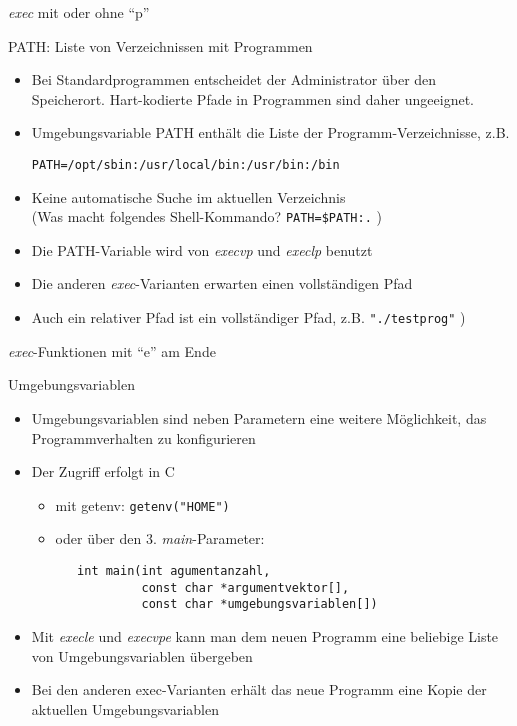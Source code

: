 \documentclass[utf8,9pt]{beamer}
\begin{document}
\begin{frame}[fragile]{{\em exec\/} mit oder ohne "`p"'}{}

\begin{block}{PATH: Liste von Verzeichnissen mit Programmen}
\begin{itemize}
\item Bei Standardprogrammen entscheidet der Administrator über den Speicherort.
   Hart-kodierte Pfade in Programmen sind daher ungeeignet.
\item Umgebungsvariable PATH enthält die Liste der Programm-Verzeichnisse, z.B.
\begin{verbatim}
PATH=/opt/sbin:/usr/local/bin:/usr/bin:/bin
\end{verbatim} 
\item Keine automatische Suche im aktuellen Verzeichnis\\
   (Was macht folgendes Shell-Kommando? {\tt PATH=\$PATH:.} )
\item Die PATH-Variable wird von {\em execvp\/} und {\em execlp\/} benutzt
\item Die anderen {\em exec\/}-Varianten erwarten einen vollständigen Pfad
\item Auch ein relativer Pfad ist ein vollständiger Pfad, z.B. \verb#"./testprog"# ) 
\end{itemize}
\end{block}
\end{frame}







\begin{frame}[fragile]{{\em exec\/}-Funktionen mit "`e"' am Ende}{}
\begin{block}{Umgebungsvariablen}
\begin{itemize}
\item Umgebungsvariablen sind neben Parametern eine weitere Möglichkeit,
   das Programmverhalten zu konfigurieren
\item Der Zugriff erfolgt in C
  \begin{itemize}
  \item mit getenv:  \verb#getenv("HOME")#
  \item oder über den 3. {\em main\/}-Parameter:
   \begin{verbatim}
   int main(int agumentanzahl, 
            const char *argumentvektor[], 
            const char *umgebungsvariablen[])
   \end{verbatim}

  \end{itemize}
 
\item Mit {\em execle\/} und {\em execvpe\/} kann man dem neuen Programm
   eine beliebige Liste von Umgebungsvariablen übergeben
\item Bei den anderen exec-Varianten erhält
   das  neue Programm eine Kopie der aktuellen Umgebungsvariablen 
\end{itemize}

\end{block}

\end{frame}
\end{document}
